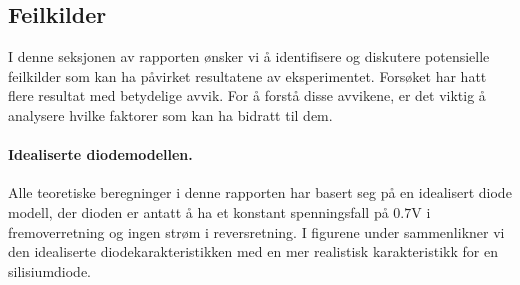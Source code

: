 \subsection{Feilkilder} %
I denne seksjonen av rapporten ønsker vi å identifisere og diskutere potensielle feilkilder som kan ha påvirket resultatene av eksperimentet. Forsøket har hatt flere resultat med betydelige avvik. For å forstå disse avvikene, er det viktig å analysere hvilke faktorer som kan ha bidratt til dem. 


\paragraph{Idealiserte diodemodellen. } Alle teoretiske beregninger i denne rapporten har basert seg på en idealisert diode modell, der dioden er antatt å ha et konstant spenningsfall på $0.7\text{V}$ i fremoverretning og ingen strøm i reversretning. I figurene under sammenlikner vi den idealiserte diodekarakteristikken med en mer realistisk karakteristikk for en silisiumdiode.

